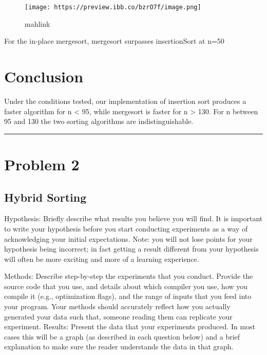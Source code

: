 \documentclass[11pt]{article}
\makeatletter
\def\maxwidth{\ifdim\Gin@nat@width>\linewidth\linewidth
    \else\Gin@nat@width\fi}
\let\Oldincludegraphics\includegraphics
\renewcommand{\includegraphics}[1]{\Oldincludegraphics[width=.8\maxwidth]{#1}}
\makeatother
\begin{document}
    \begin{figure}
\centering
\texttt{[image: https://preview.ibb.co/bzrO7f/image.png]}
\caption{mahlink}
\end{figure}

For the in-place mergesort, mergesort surpasses insertionSort at n=50

    \section{Conclusion}\label{conclusion}

Under the conditions tested, our implementation of insertion sort
produces a faster algorithm for n \textless{} 95, while mergesort is
faster for n \textgreater{} 130. For n between 95 and 130 the two
sorting algorithms are indistinguishable.

    \begin{center}\rule{0.5\linewidth}{\linethickness}\end{center}

\section{Problem 2}\label{problem-2}

\subsection{Hybrid Sorting}\label{hybrid-sorting}

    Hypothesis: Briefly describe what results you believe you will find. It
is important to write your hypothesis before you start conducting
experiments as a way of acknowledging your initial expectations. Note:
you will not lose points for your hypothesis being incorrect; in fact
getting a result different from your hypothesis will often be more
exciting and more of a learning experience.

Methods: Describe step-by-step the experiments that you conduct. Provide
the source code that you use, and details about which compiler you use,
how you compile it (e.g., optimization flags), and the range of inputs
that you feed into your program. Your methods should accurately reflect
how you actually generated your data such that, someone reading them can
replicate your experiment. Results: Present the data that your
experiments produced. In most cases this will be a graph (as described
in each question below) and a brief explanation to make sure the reader
understands the data in that graph.
\end{document}
